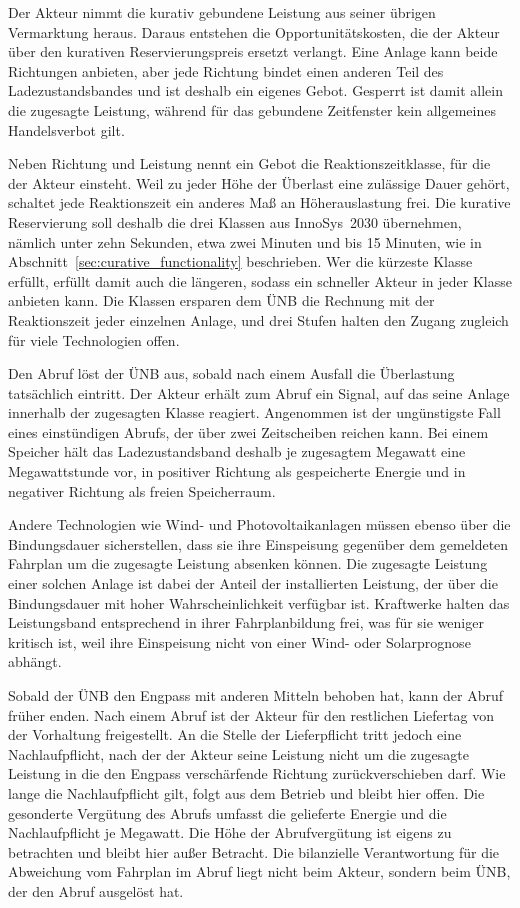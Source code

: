 Der Akteur nimmt die kurativ gebundene Leistung aus seiner übrigen Vermarktung heraus.
Daraus entstehen die Opportunitätskosten, die der Akteur über den kurativen Reservierungspreis ersetzt verlangt.
Eine Anlage kann beide Richtungen anbieten, aber jede Richtung bindet einen anderen Teil des Ladezustandsbandes und ist deshalb ein eigenes Gebot.
Gesperrt ist damit allein die zugesagte Leistung, während für das gebundene Zeitfenster kein allgemeines Handelsverbot gilt.

Neben Richtung und Leistung nennt ein Gebot die Reaktionszeitklasse, für die der Akteur einsteht.
Weil zu jeder Höhe der Überlast eine zulässige Dauer gehört, schaltet jede Reaktionszeit ein anderes Maß an Höherauslastung frei.
Die kurative Reservierung soll deshalb die drei Klassen aus InnoSys~2030 übernehmen, nämlich unter zehn Sekunden, etwa zwei Minuten und bis 15 Minuten, wie in Abschnitt~\ref{sec:curative_functionality} beschrieben.
Wer die kürzeste Klasse erfüllt, erfüllt damit auch die längeren, sodass ein schneller Akteur in jeder Klasse anbieten kann.
Die Klassen ersparen dem \ac{ÜNB} die Rechnung mit der Reaktionszeit jeder einzelnen Anlage, und drei Stufen halten den Zugang zugleich für viele Technologien offen.

Den Abruf löst der \ac{ÜNB} aus, sobald nach einem Ausfall die Überlastung tatsächlich eintritt.
Der Akteur erhält zum Abruf ein Signal, auf das seine Anlage innerhalb der zugesagten Klasse reagiert.
Angenommen ist der ungünstigste Fall eines einstündigen Abrufs, der über zwei Zeitscheiben reichen kann.
Bei einem Speicher hält das Ladezustandsband deshalb je zugesagtem Megawatt eine Megawattstunde vor, in positiver Richtung als gespeicherte Energie und in negativer Richtung als freien Speicherraum.

Andere Technologien wie Wind- und Photovoltaikanlagen müssen ebenso über die Bindungsdauer sicherstellen, dass sie ihre Einspeisung gegenüber dem gemeldeten Fahrplan um die zugesagte Leistung absenken können.
Die zugesagte Leistung einer solchen Anlage ist dabei der Anteil der installierten Leistung, der über die Bindungsdauer mit hoher Wahrscheinlichkeit verfügbar ist.
Kraftwerke halten das Leistungsband entsprechend in ihrer Fahrplanbildung frei, was für sie weniger kritisch ist, weil ihre Einspeisung nicht von einer Wind- oder Solarprognose abhängt.

Sobald der \ac{ÜNB} den Engpass mit anderen Mitteln behoben hat, kann der Abruf früher enden.
Nach einem Abruf ist der Akteur für den restlichen Liefertag von der Vorhaltung freigestellt.
An die Stelle der Lieferpflicht tritt jedoch eine Nachlaufpflicht, nach der der Akteur seine Leistung nicht um die zugesagte Leistung in die den Engpass verschärfende Richtung zurückverschieben darf.
Wie lange die Nachlaufpflicht gilt, folgt aus dem Betrieb und bleibt hier offen.
Die gesonderte Vergütung des Abrufs umfasst die gelieferte Energie und die Nachlaufpflicht je Megawatt.
Die Höhe der Abrufvergütung ist eigens zu betrachten und bleibt hier außer Betracht.
Die bilanzielle Verantwortung für die Abweichung vom Fahrplan im Abruf liegt nicht beim Akteur, sondern beim \ac{ÜNB}, der den Abruf ausgelöst hat.

